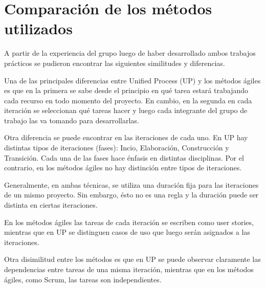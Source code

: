 \section{Comparación de los métodos utilizados}

A partir de la experiencia del grupo luego de haber desarrollado ambos trabajos prácticos se
pudieron encontrar las siguientes similitudes y diferencias. 


Una de las principales diferencias entre Unified Process (UP) y los métodos ágiles es que en la primera se sabe
desde el principio en qué tarea estará trabajando cada recurso en todo momento
del proyecto. En cambio, en la segunda en cada iteración se seleccionan qué tareas hacer y luego
cada integrante del grupo de trabajo las va tomando para desarrollarlas.


Otra diferencia se puede encontrar en las iteraciones de cada uno. En UP hay distintas
tipos de iteraciones (fases): Incio, Elaboración, Construcción y Transición. Cada una de las fases hace 
énfasis en distintas disciplinas. Por el contrario, en los métodos ágiles no hay distinción entre tipos 
de iteraciones.


Generalmente, en ambas técnicas, se utiliza una duración fija para las iteraciones de un mismo proyecto. 
Sin embargo, ésto no es una regla y la duración puede ser distinta en ciertas iteraciones.


En los métodos ágiles las tareas de cada iteración se escriben como user stories, mientras que en UP
se distinguen casos de uso que luego serán asignados a las iteraciones.


Otra disimilitud entre los métodos es que en UP se puede observar claramente las dependencias entre
tareas de una misma iteración, mientras que en los métodos ágiles, como Scrum, las tareas son independientes.
